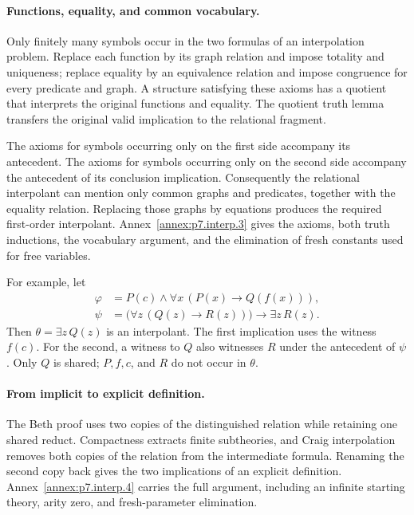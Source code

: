 \paragraph{Functions, equality, and common vocabulary.}
Only finitely many symbols occur in the two formulas of an interpolation
problem.  Replace each function by its graph relation and impose totality
and uniqueness; replace equality by an equivalence relation and impose
congruence for every predicate and graph.  A structure satisfying these
axioms has a quotient that interprets the original functions and equality.
The quotient truth lemma transfers the original valid implication to the
relational fragment.

The axioms for symbols occurring only on the first side accompany its
antecedent.  The axioms for symbols occurring only on the second side
accompany the antecedent of its conclusion implication.  Consequently the
relational interpolant can mention only common graphs and predicates,
together with the equality relation.  Replacing those graphs by equations
produces the required first-order interpolant.
Annex~\ref{annex:p7.interp.3} gives the axioms, both truth inductions, the
vocabulary argument, and the elimination of fresh constants used for free
variables.

For example, let
\[
\begin{aligned}
 \varphi&=P(c)\land\forall x\,(P(x)\to Q(f(x))),\\
 \psi&=\bigl(\forall z\,(Q(z)\to R(z))\bigr)\to\exists z\,R(z).
\end{aligned}
\]
Then \(\theta=\exists z\,Q(z)\) is an interpolant.  The first implication
uses the witness \(f(c)\).  For the second, a witness to \(Q\) also
witnesses \(R\) under the antecedent of \(\psi\).
Only \(Q\) is shared; \(P,f,c\), and \(R\) do not occur in \(\theta\).

\paragraph{From implicit to explicit definition.}
The Beth proof uses two copies of the distinguished relation while retaining
one shared reduct.  Compactness extracts finite subtheories, and Craig
interpolation removes both copies of the relation from the intermediate
formula.  Renaming the second copy back gives the two implications of an
explicit definition.  Annex~\ref{annex:p7.interp.4} carries the full argument,
including an infinite starting theory, arity zero, and fresh-parameter
elimination.

